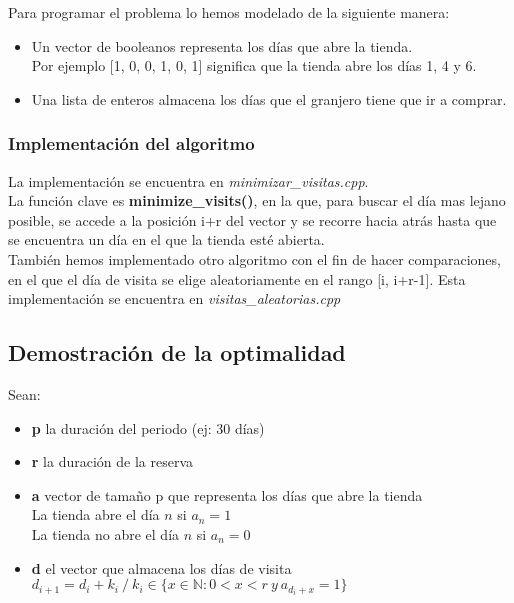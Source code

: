 Para programar el problema lo hemos modelado de la siguiente manera:\\

\begin{itemize}
\item Un vector de booleanos representa los días que abre la tienda.\\
Por ejemplo [1, 0, 0, 1, 0, 1] significa que la tienda abre los días 1, 4 y 6.\\
\item Una lista de enteros almacena los días que el granjero tiene que ir a comprar.
\end{itemize}


\subsubsection{Implementación del algoritmo}

La implementación se encuentra en \textit{minimizar\_visitas.cpp}.\\
La función clave es \textbf{minimize\_visits()}, en la que, para buscar el día mas lejano posible, se accede a la posición i+r del vector y se recorre hacia atrás hasta que se encuentra un día en el que la tienda esté abierta.\\

También hemos implementado otro algoritmo con el fin de hacer comparaciones, en el que el día de visita se elige aleatoriamente en el rango [i, i+r-1]. Esta implementación se encuentra en \textit{visitas\_aleatorias.cpp}\\



\subsection{Demostración de la optimalidad}

Sean:\\
\begin{itemize}
\item \textbf{p} la duración del periodo (ej: 30 días)
\item \textbf{r} la duración de la reserva
\item \textbf{a} vector de tamaño p que representa los días que abre la tienda\\
La tienda abre el día $n$ si $a_n = 1$\\
La tienda no abre el día $n$ si $a_n = 0$
\item \textbf{d} el vector que almacena los días de visita\\
$d_{i+1} = d_i + k_i\ /\ k_i \in \{x \in \mathbb{N} : 0<x<r\ y\ a_{d_i+x} = 1\}$\\
\end{itemize}

